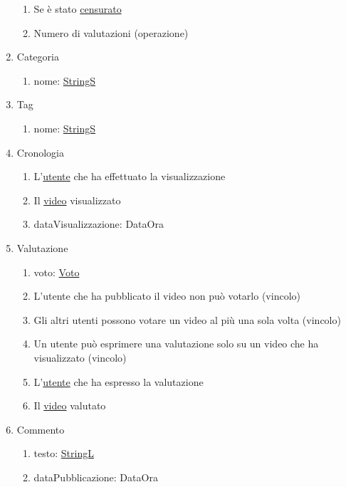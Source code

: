 \documentclass{article}
\begin{document}
\begin{enumerate}
\begin{enumerate}
        \item Se è stato \hyperref[sec:RequisitiVideoCensurato]{censurato}
        \item Numero di valutazioni (operazione)
    \end{enumerate}
    \item\label{sec:RequisitiCategoria} Categoria
    \begin{enumerate}
        \item nome: \hyperref[sec:TipoStringS]{StringS}
    \end{enumerate}
    \item\label{sec:RequisitiTag} Tag
    \begin{enumerate}
        \item nome: \hyperref[sec:TipoStringS]{StringS}
    \end{enumerate}
    \item\label{sec:RequisitiCronologia} Cronologia
    \begin{enumerate}
        \item L'\hyperref[sec:RequisitiUtente]{utente} che ha effettuato la visualizzazione
        \item Il \hyperref[sec:RequisitiVideo]{video} visualizzato
        \item dataVisualizzazione: DataOra
    \end{enumerate}
    \item\label{sec:RequisitiValutazione} Valutazione
    \begin{enumerate}
        \item voto: \hyperref[sec:TipoVoto]{Voto}
        \item L'utente che ha pubblicato il video non può votarlo (vincolo)
        \item Gli altri utenti possono votare un video al più una sola volta (vincolo)
        \item Un utente può esprimere una valutazione solo su un video che ha visualizzato (vincolo)
        \item L'\hyperref[sec:RequisitiUtente]{utente} che ha espresso la valutazione
        \item Il \hyperref[sec:RequisitiVideo]{video} valutato
    \end{enumerate}
    \item\label{sec:RequisitiCommento} Commento
    \begin{enumerate}
        \item testo: \hyperref[sec:TipoStringL]{StringL}
        \item dataPubblicazione: DataOra

\end{enumerate}
\end{enumerate}
\end{document}
